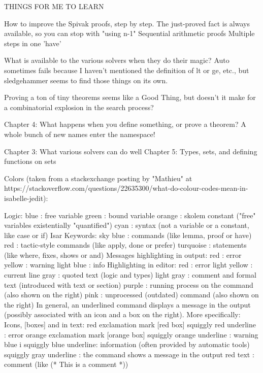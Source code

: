 THINGS FOR ME TO LEARN

How to improve the Spivak proofs, step by step. 
The just-proved fact is always available, so you can stop with "using n-1"
Sequential arithmetic proofs
Multiple steps in one 'have'


What is available to the various solvers when they do their magic? Auto sometimes fails because I haven't mentioned the definition of lt or ge, etc., but sledgehammer seems to find those things on its own. 

Proving a ton of tiny theorems seems like a Good Thing, but doesn't it make for a combinatorial explosion in the search process?  

Chapter 4: What happens when you define something, or prove a theorem? A whole bunch of new names enter the namespace!

Chapter 3: What various solvers can do well
Chapter 5: Types, sets, and defining functions on sets

Colors (taken from a stackexchange posting by "Mathieu" at https://stackoverflow.com/questions/22635300/what-do-colour-codes-mean-in-isabelle-jedit):

Logic:
blue : free variable
green : bound variable
orange : skolem constant ("free" variables existentially "quantified")
cyan : syntax (not a variable or a constant, like case or if)
Isar Keywords:
sky blue : commands (like lemma, proof or have)
red : tactic-style commands (like apply, done or prefer)
turquoise : statements (like where, fixes, shows or and)
Messages highlighting in output:
red : error
yellow : warning
light blue : info
Highlighting in editor:
red : error
light yellow : current line
gray : quoted text (logic and types)
light gray : comment and formal text (introduced with text or section)
purple : running process on the command (also shown on the right)
pink : unprocessed (outdated) command (also shown on the right)
In general, an underlined command displays a message in the output (possibly associated with an icon and a box on the right). More specifically:
Icons, [boxes] and {in text}:
red exclamation mark [red box] {squiggly red underline} : error
orange exclamation mark [orange box] {squiggly orange underline} : warning
blue i {squiggly blue underline}: information (often provided by automatic tools)
{squiggly gray underline} : the command shows a message in the output
{red text} : comment (like (* This is a comment *))